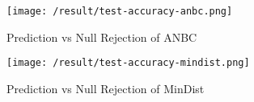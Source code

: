\begin{figure}
	[h]
	\texttt{[image: /result/test-accuracy-anbc.png]}
	\caption{Prediction vs Null Rejection of ANBC}
	\label{ev:accuracy:anbc}
\end{figure}
\begin{figure} 	
	[h]
	\texttt{[image: /result/test-accuracy-mindist.png]}
	\caption{Prediction vs Null Rejection of MinDist}
	\label{ev:accuracy:mindist}
\end{figure}